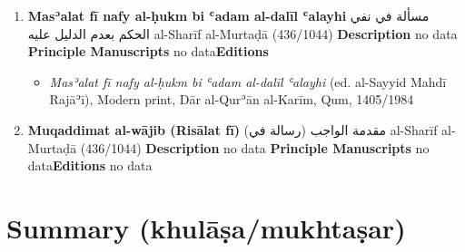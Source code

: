 \documentclass{article}
\begin{document}
\begin{enumerate}
      \item \textbf{Masʾalat fī nafy al-ḥukm bi ʿadam al-dalīl ʿalayhi}
        \newline
        \textarabic{مسألة في نفي الحكم بعدم الدليل عليه}
        \newline
        al-Sharīf al-Murtaḍā
        \newline
        (436/1044)
        \newline
        \newline
        \textbf{Description}
        \newline	
        no data
        \newline
        \newline
    \textbf{Principle Manuscripts}
\newline
no data\newline\textbf{Editions}
\begin{itemize}
        \item \emph{Masʾalat fī nafy al-ḥukm bi ʿadam al-dalīl ʿalayhi} (ed. al-Sayyid Mahdī Rajāʾī), Modern print, Dār al-Qurʾān al-Karīm, Qum, 1405/1984
        \end{itemize}

      \item \textbf{Muqaddimat al-wājib (Risālat fī)}
        \newline
        \textarabic{مقدمة الواجب (رسالة في)}
        \newline
        al-Sharīf al-Murtaḍā
        \newline
        (436/1044)
        \newline
        \newline
        \textbf{Description}
        \newline	
        no data
        \newline
        \newline
    \textbf{Principle Manuscripts}
\newline
no data\newline\textbf{Editions}
\newline
no data\newline\end{enumerate}\section{Summary (khulāṣa/mukhtaṣar)}
\end{document}

